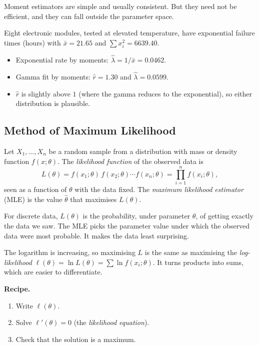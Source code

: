 Moment estimators are simple and usually consistent. But they need not be efficient, and they can fall outside the parameter space.

\begin{example}
Eight electronic modules, tested at elevated temperature, have exponential failure times (hours) with $\bar{x}=21.65$ and $\sum x_i^2=6639.40$.
\begin{itemize}
  \item Exponential rate by moments: $\hat\lambda=1/\bar{x}=0.0462$.
  \item Gamma fit by moments: $\hat{r}=1.30$ and $\hat\lambda=0.0599$.
  \item $\hat{r}$ is slightly above $1$ (where the gamma reduces to the exponential), so either distribution is plausible.
\end{itemize}
\end{example}

\subsection{Method of Maximum Likelihood}

\begin{definition}
Let $X_1,\dots,X_n$ be a random sample from a distribution with mass or density function $f(x;\theta)$. The \emph{likelihood function} of the observed data is
\[ L(\theta)=f(x_1;\theta)\,f(x_2;\theta)\cdots f(x_n;\theta)=\prod_{i=1}^nf(x_i;\theta), \]
seen as a function of $\theta$ with the data fixed. The \emph{maximum likelihood estimator} (MLE) is the value $\hat\theta$ that maximises $L(\theta)$.
\end{definition}

\begin{intuition}
For discrete data, $L(\theta)$ is the probability, under parameter $\theta$, of getting exactly the data we saw. The MLE picks the parameter value under which the observed data were most probable. It makes the data least surprising.
\end{intuition}

The logarithm is increasing, so maximising $L$ is the same as maximising the \emph{log-likelihood} $\ell(\theta)=\ln L(\theta)=\sum\ln f(x_i;\theta)$. It turns products into sums, which are easier to differentiate.

\textbf{Recipe.}
\begin{enumerate}
  \item Write $\ell(\theta)$.
  \item Solve $\ell'(\theta)=0$ (the \emph{likelihood equation}).
  \item Check that the solution is a maximum.
\end{enumerate}

